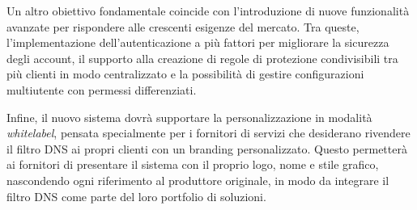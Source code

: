 Un altro obiettivo fondamentale coincide con l'introduzione di nuove funzionalità avanzate per rispondere alle crescenti esigenze del mercato. Tra queste, l’implementazione dell’autenticazione a più fattori per migliorare la sicurezza degli account, il supporto alla creazione di regole di protezione condivisibili tra più clienti in modo centralizzato e la possibilità di gestire configurazioni multiutente con permessi differenziati.

Infine, il nuovo sistema dovrà supportare la personalizzazione in modalità \emph{whitelabel}, pensata specialmente per i fornitori di servizi che desiderano rivendere il filtro DNS ai propri clienti con un branding personalizzato. Questo permetterà ai fornitori di presentare il sistema con il proprio logo, nome e stile grafico, nascondendo ogni riferimento al produttore originale, in modo da integrare il filtro DNS come parte del loro portfolio di soluzioni.
